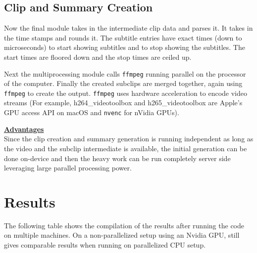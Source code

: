 \documentclass{article}
\begin{document}
		\subsection{Clip and Summary Creation}	
			Now the final module takes in the intermediate clip data and parses it. It takes in the time stamps and rounds it. The subtitle entries have exact times (down to microseconds) to start showing subtitles and to stop showing the subtitles. The start times are floored down and the stop times are ceiled up. 
			
			
			Next the multiprocessing module calls \verb|ffmpeg| running parallel on the processor of the computer. Finally the created subclips are merged together, again using \verb|ffmpeg| to create the output. \verb|ffmpeg| uses hardware acceleration to encode video streams (For example, h264\_videotoolbox and h265\_videotoolbox are Apple's GPU access API on macOS and \verb|nvenc| for nVidia GPUs).
			
			\begin{mdframed}
				\textbf{\underline{Advantages}}\\
					Since the clip creation and summary generation is running independent as long as the video and the subclip intermediate is available, the initial generation can be done on-device and then the heavy work can be run completely server side leveraging large parallel processing power.
			\end{mdframed}
			
	\section{Results}
	
	The following table shows the compilation of the results after running the code on multiple machines. On a non-parallelized setup using an Nvidia GPU, still gives comparable results when running on parallelized CPU setup.
\end{document}
